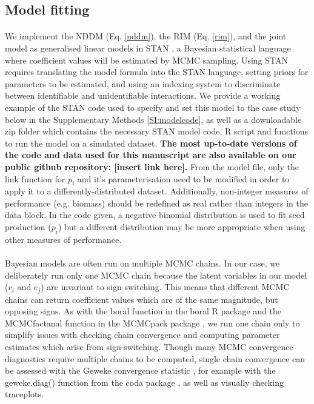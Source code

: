 \documentclass[a4,12pt]{article}
\begin{document}
    \subsection{Model fitting}

        \paragraph{}        
        We implement the NDDM (Eq. \ref{nddm}), the RIM (Eq. \ref{rim}), and the joint model as generalised linear models in STAN \parencite{Carpenter2017}, a Bayesian statistical language where coefficient values will be estimated by MCMC sampling. Using STAN requires translating the model formula into the STAN language, setting priors for parameters to be estimated, and using an indexing system to discriminate between identifiable and unidentifiable interactions. We provide a working example of the STAN code used to specify and set this model to the case study below in the Supplementary Methods \ref{SI:modelcode}, as well as a downloadable zip folder which contains the necessary STAN model code, R script and functions to run the model on a simulated dataset. \textbf{The most up-to-date versions of the code and data used for this manuscript are also available on our public  github repository: [insert link here].}
        From the model file, only the link function for $p_i$ and it's parameterisation need to be modified in order to apply it to a differently-distributed dataset. Additionally, non-integer measures of performance (e.g. biomass) should be redefined as real rather than integers in the data block. In the code given, a negative binomial distribution is used to fit seed production ($p_i$) but a different distribution may be more appropriate when using other measures of performance.   

        \paragraph{}
        Bayesian models are often run on multiple MCMC chains. In our case, we deliberately run only one MCMC chain because the latent variables in our model ($r_i$ and $e_j$) are invariant to sign switching. This means that different MCMC chains can return coefficient values which are of the same magnitude, but opposing signs. As with the boral function in the boral R package \parencite{Hui2021} and the MCMCfactanal function in the MCMCpack package \parencite{Martin2011}, we run one chain only to simplify issues with checking chain convergence and computing parameter estimates which arise from sign-switching. Though many MCMC convergence diagnostics require multiple chains to be computed, single chain convergence can be assessed with the Geweke convergence statistic \parencite{Geweke1992}, for example with the geweke.diag() function from the coda package \parencite{Plummer2006}, as well as visually checking traceplots.
\end{document}
